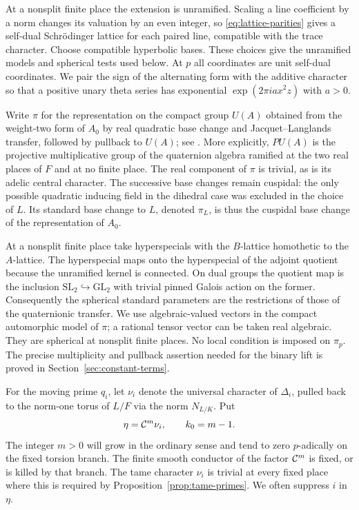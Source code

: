 At a nonsplit finite place the extension is unramified.  Scaling a line
coefficient by a norm changes its valuation by an even integer, so
\eqref{eq:lattice-parities} gives a self-dual Schr\"odinger lattice for each
paired line, compatible with the trace character.  Choose compatible
hyperbolic bases.  These choices give the unramified models and spherical
tests used below.  At $p$ all coordinates are unit self-dual coordinates.
We pair the sign of the alternating form with the additive character so
that a positive unary theta series has exponential
$\exp(2\pi i a x^2z)$ with $a>0$.

Write $\pi$ for the representation on the compact group $U(A)$ obtained
from the weight-two form of $A_0$ by real quadratic base change and
Jacquet--Langlands transfer, followed by pullback to $U(A)$; see
\cite{ArthurClozel1989,JacquetLanglands1970}.  More explicitly,
$PU(A)$ is the projective multiplicative group of the quaternion algebra
ramified at the two real places of $F$ and at no finite place.  The real
component of $\pi$ is trivial, as is its adelic central character.
The successive base changes remain cuspidal: the only possible
quadratic inducing field in the dihedral case was excluded in the choice
of $L$.  Its standard base change to $L$, denoted $\pi_L$, is thus the
cuspidal base change of the representation of $A_0$.

At a nonsplit finite place take hyperspecials with the $B$-lattice
homothetic to the $A$-lattice.  The hyperspecial maps onto the hyperspecial
of the adjoint quotient because the unramified kernel is connected.  On
dual groups the quotient map is the inclusion
$\mathrm{SL}_2\hookrightarrow\mathrm{GL}_2$ with trivial pinned Galois
action on the former.  Consequently the spherical standard parameters
are the restrictions of those of the quaternionic transfer.  We use
algebraic-valued vectors in the compact automorphic model of $\pi$;
a rational tensor vector can be taken real algebraic.  They are spherical
at nonsplit finite places.  No local condition is imposed on $\pi_p$.
The precise multiplicity and pullback assertion needed for the binary
lift is proved in Section~\ref{sec:constant-terms}.

For the moving prime $q_i$, let $\nu_i$ denote the universal character of
$\Delta_i$, pulled back to the norm-one torus of $L/F$ via the norm
$N_{L/K}$.
Put
\begin{equation}\label{eq:theta-character}
 \eta=\mathcal C^m\nu_i,\qquad k_0=m-1.
\end{equation}
The integer $m>0$ will grow in the ordinary sense and tend to zero
$p$-adically on the fixed torsion branch.  The finite smooth conductor
of the factor $\mathcal C^m$ is fixed, or is killed by that branch.
The tame character $\nu_i$ is trivial
at every fixed place where this is required by
Proposition~\ref{prop:tame-primes}.  We often suppress $i$ in $\eta$.

